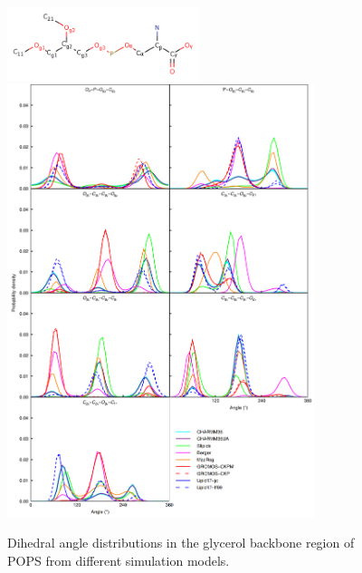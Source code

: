 \documentclass[journal=jpcbfk,manuscript=article]{achemso}
\begin{document}
\begin{figure}[]
  \centering
    \includegraphics[width=0.5\textwidth]{../Figs/PS_Labels.png}
  \includegraphics[width=0.8\textwidth]{../Figs/figS6.png}
  \caption{\label{dihedralsGLY}
    Dihedral angle distributions in the glycerol backbone region of POPS from different simulation models.
  }
\end{figure}
\end{document}
